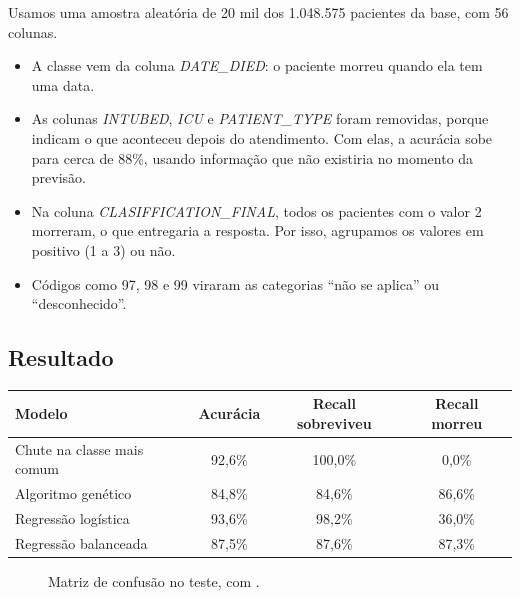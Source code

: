 \documentclass[11pt,a4paper]{article}
\newcommand{\code}[1]{\texttt{\detokenize{#1}}}
\newenvironment{tabela}{\par\nopagebreak[4]\vspace{0.3em}\nopagebreak[4]\begingroup\centering\small}{\par\endgroup\vspace{0.6em}}
\newcommand{\cmcell}[5]{%
  \pgfmathsetmacro{\intens}{8+80*(#3/#4)}%
  \pgfmathsetmacro{\escuro}{ifthenelse(\intens>62,1,0)}%
  \ifdim\escuro pt>0.5pt\def\corval{white}\else\def\corval{tinta}\fi
  \node[draw=white,line width=1.2pt,fill=azul!\intens,minimum width=#5 cm,minimum height=#5 cm,
    inner sep=0pt,text=\corval,font=\small] at (#1*#5,-#2*#5) {#3};}
\begin{document}
Usamos uma amostra aleatória de 20 mil dos 1.048.575 pacientes da base, com 56 colunas.

\begin{itemize}
  \item A classe vem da coluna \emph{DATE\_DIED}: o paciente morreu quando ela tem uma data.
  \item As colunas \emph{INTUBED}, \emph{ICU} e \emph{PATIENT\_TYPE} foram removidas, porque indicam o que aconteceu depois do atendimento. Com elas, a acurácia sobe para cerca de 88\%, usando informação que não existiria no momento da previsão.
  \item Na coluna \emph{CLASIFFICATION\_FINAL}, todos os pacientes com o valor 2 morreram, o que entregaria a resposta. Por isso, agrupamos os valores em positivo (1 a 3) ou não.
  \item Códigos como 97, 98 e 99 viraram as categorias ``não se aplica'' ou ``desconhecido''.
\end{itemize}

\subsection{Resultado}

\begin{tabela}
\begin{tabular}{lccc}
\toprule
Modelo & Acurácia & Recall sobreviveu & Recall morreu\\
\midrule
Chute na classe mais comum & 92,6\% & 100,0\% & 0,0\%\\
Algoritmo genético & 84,8\% & 84,6\% & 86,6\%\\
Regressão logística & 93,6\% & 98,2\% & 36,0\%\\
Regressão balanceada & 87,5\% & 87,6\% & 87,3\%\\
\bottomrule
\end{tabular}
\end{tabela}

\begin{figure}[H]
\centering
{}
\caption{Matriz de confusão no teste, com \code{seed=0}.}
\end{figure}
\end{document}
